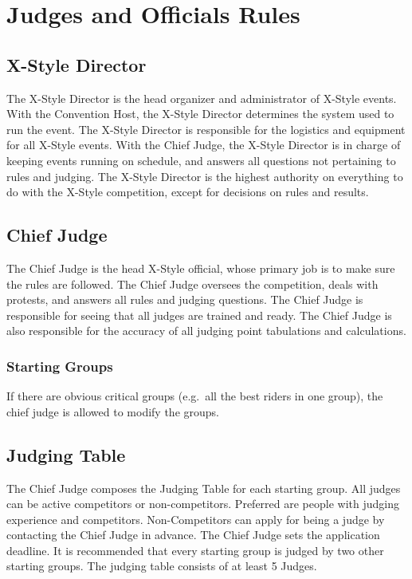 \chapter{Judges and Officials Rules}

\section{X-Style Director}

The X-Style Director is the head organizer and administrator of X-Style events.
With the Convention Host, the X-Style Director determines the system used to run the event.
The X-Style Director is responsible for the logistics and equipment for all X-Style events.
With the Chief Judge, the X-Style Director is in charge of keeping events running on schedule, and answers all questions not pertaining to rules and judging.
The X-Style Director is the highest authority on everything to do with the X-Style competition, except for decisions on rules and results.

\section{Chief Judge}

The Chief Judge is the head X-Style official, whose primary job is to make sure the rules are followed.
The Chief Judge oversees the competition, deals with protests, and answers all rules and judging questions.
The Chief Judge is responsible for seeing that all judges are trained and ready.
The Chief Judge is also responsible for the accuracy of all judging point tabulations and calculations.

\subsection{Starting Groups}
If there are obvious critical groups (e.g.\ all the best riders in one group), the chief judge is allowed to modify the groups.

\section{Judging Table}

The Chief Judge composes the Judging Table for each starting group.
All judges can be active competitors or non-competitors.
Preferred are people with judging experience and competitors.
Non-Competitors can apply for being a judge by contacting the Chief Judge in advance.
The Chief Judge sets the application deadline.
It is recommended that every starting group is judged by two other starting groups.
The judging table consists of at least 5 Judges.

